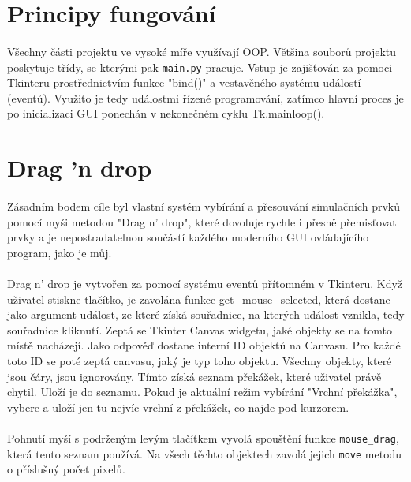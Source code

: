 \documentclass[12pt,a4paper]{report}
\begin{document}
\section{Principy fungování}
\paragraph{} Všechny části projektu ve vysoké míře využívají OOP. Většina souborů projektu poskytuje třídy, se kterými pak \lstinline{main.py} pracuje. Vstup je zajišťován za pomoci Tkinteru prostřednictvím funkce "bind()" a vestavěného systému událostí (eventů). Využito je tedy událostmi řízené programování, zatímco hlavní proces je po inicializaci GUI ponechán v nekonečném cyklu Tk.mainloop().
\section{Drag 'n drop}
\paragraph{} Zásadním bodem cíle byl vlastní systém vybírání a přesouvání simulačních prvků pomocí myši metodou "Drag n' drop", které dovoluje rychle i přesně přemisťovat prvky a je nepostradatelnou součástí každého moderního GUI ovládajícího program, jako je můj.
\paragraph{} Drag n' drop je vytvořen za pomocí systému eventů přítomném v Tkinteru. Když uživatel stiskne tlačítko, je zavolána funkce get\_mouse\_selected, která dostane jako argument událost, ze které získá souřadnice, na kterých událost vznikla, tedy souřadnice kliknutí. Zeptá se Tkinter Canvas widgetu, jaké objekty se na tomto místě nacházejí. Jako odpověď dostane interní ID objektů na Canvasu. Pro každé toto ID se poté zeptá canvasu, jaký je typ toho objektu. Všechny objekty, které jsou čáry, jsou ignorovány. Tímto získá seznam překážek, které uživatel právě chytil. Uloží je do seznamu. Pokud je aktuální režim vybírání "Vrchní překážka", vybere a uloží jen tu nejvíc vrchní z překážek, co najde pod kurzorem.
\paragraph{} Pohnutí myší s podrženým levým tlačítkem vyvolá spouštění funkce \lstinline{mouse_drag}, která tento seznam používá. Na všech těchto objektech zavolá jejich \lstinline{move} metodu o příslušný počet pixelů.
\end{document}

